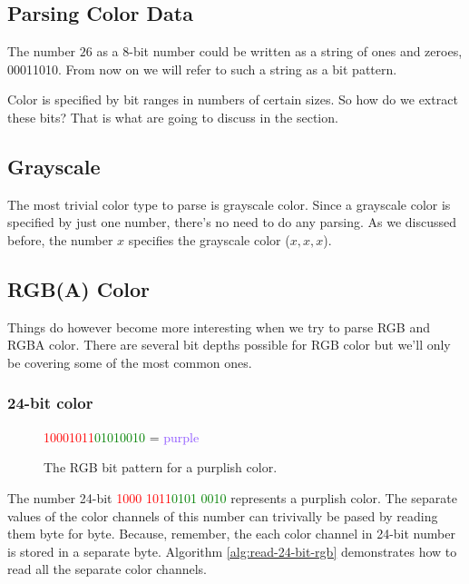 \begin{refsection}
  \section{Parsing Color Data}
  \label{sec:parsing-color-data}

  The number $26$ as a 8-bit number could be written as a string of
  ones and zeroes, 00011010. From now on we will refer to such a
  string as a bit pattern.

  Color is specified by bit ranges in numbers of certain
  sizes. So how do we extract these bits? That is what are going to
  discuss in the section.

  \subsection{Grayscale}

  The most trivial color type to parse is grayscale color. Since a
  grayscale color is specified by just one number, there's no need to
  do any parsing. As we discussed before, the number $x$ specifies the
  grayscale color \mbox{($x,x,x$)}. 

  \subsection{RGB(A) Color}

  Things do however become more interesting when we try to parse RGB
  and RGBA color. There are several bit depths possible for RGB
  color but we'll only be covering some of the most common ones.

  \subsubsection{24-bit color}

  \begin{figure}
    \centering
    {\huge\textcolor{red}{10001011}\textcolor{green}{01010010}\textcolor{blue}{\fullbyte}
    = \textcolor[HTML]{8B52FF}{purple}}
    \caption{The RGB bit pattern for a purplish color.}
    \label{fig:24-bit-colors-bits}
  \end{figure}

  The number 24-bit \textcolor{red}{1000 1011}\textcolor{green}{0101
    0010}\textcolor{blue}{\fullbyte} represents a purplish color. The
  separate values of the color channels of this number can trivivally
  be pased by reading them byte for byte. Because, remember, the each
  color channel in 24-bit number is stored in a separate
  byte. Algorithm \ref{alg:read-24-bit-rgb} demonstrates how to read
  all the separate color channels.


\end{refsection}
